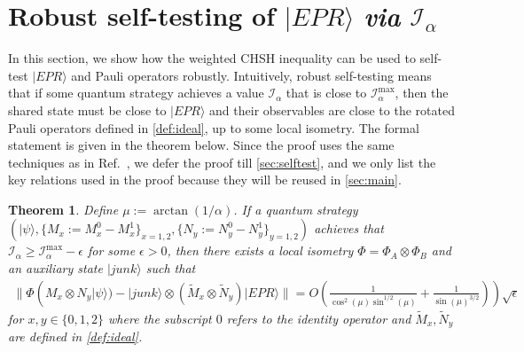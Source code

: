 \documentclass[11pt,letterpaper]{article}
\newcommand{\ket}[1]{|#1\rangle}
\newcommand{\x}{\otimes}
\newcommand{\1}{\mathbb{1}}
\newcommand{\LS}{LS}
\newcommand{\tM}{\tilde{M}}
\newcommand{\tN}{\tilde{N}}
\newcommand{\I}{\mathcal{I}}
\newtheorem{theorem}{Theorem}[section]
\newtheorem{proposition}[theorem]{Proposition}
\theoremstyle{definition}
\begin{document}

\section{Robust self-testing of $\ket{EPR}$ \textit{via} $\I_\alpha$}
\label{sec:chsh}
In this section, we show how the weighted CHSH inequality can be used to self-test $\ket{EPR}$ and Pauli operators robustly.
Intuitively, robust self-testing means that if some quantum strategy achieves a value $\I_\alpha$ that is close to $\I_\alpha^{\max}$,
then the shared state must be close to $\ket{EPR}$ and their observables are close to the rotated Pauli operators 
defined in \cref{def:ideal},
up to some local isometry.
The formal statement is given in the theorem below. Since the proof uses the same techniques as in Ref.~\cite{bamps2015},
we defer the proof till \cref{sec:selftest}, and we only list the key relations used in the proof because they will be reused in 
\cref{sec:main}.
\begin{theorem}
\label{thm:selftest}
    Define $\mu := \arctan(1/\alpha)$.
	If a quantum strategy $(\ket{\psi}, \{M_x:=M_x^0-M_x^1\}_{x=1,2}, \{N_y :=N_y^0-N_y^1\}_{y = 1,2} )$ achieves that
	$\I_\alpha \geq \I_\alpha^{\max} - \epsilon$
	for some $\epsilon > 0$, then
	there exists a local isometry $\Phi = \Phi_A \x \Phi_B$ and an auxiliary state $\ket{junk}$  such that
	\begin{align*}
		\| \Phi( M_x \x N_y \ket{\psi}) -\ket{junk} \x (\tM_x \x \tN_y) \ket{EPR}  \| = O(\frac{1}{\cos^2(\mu)\sin^{1/2}(\mu)}+
		\frac{1}{\sin(\mu)^{3/2}})) \sqrt{\epsilon}
	\end{align*}
	for $x,y \in \{0, 1, 2\}$ where the subscript $0$ refers to the identity operator and $\tM_x, \tN_y$ are 
	defined in \cref{def:ideal}.  
\end{theorem}
\end{document}
